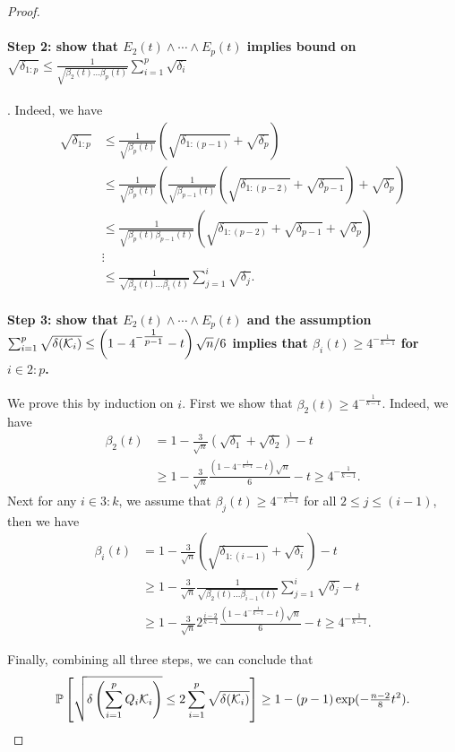 \begin{proof}
    \paragraph{Step 2: show that $E_2(t) \land\cdots\land E_p(t)$ implies bound on $\sqrt{\delta_{1:p}}\leq\tfrac{1}{\sqrt{\beta_2(t)\dots\beta_p(t)}}\sum_{i=1}^p\sqrt{\delta_i}$}. Indeed, we have 
    \begin{align*}
      \sqrt{\delta_{1:p}} &\leq \tfrac{1}{\sqrt{\beta_p(t)}}\left( \sqrt{\delta_{1:(p-1)}} + \sqrt{\delta_p}\right)
      \\&\leq \tfrac{1}{\sqrt{\beta_p(t)}}\left( \tfrac{1}{\sqrt{\beta_{p-1}(t)}}\left( \sqrt{\delta_{1:(p-2)}} + \sqrt{\delta_{p-1}}\right) + \sqrt{\delta_p}\right)
      \\&\leq \tfrac{1}{\sqrt{\beta_p(t)\beta_{p-1}(t)}}\left( \sqrt{\delta_{1:(p-2)}} + \sqrt{\delta_{p-1}} + \sqrt{\delta_p}\right)
      \\&\vdots
      \\&\leq \tfrac{1}{\sqrt{\beta_2(t)\dots\beta_i(t)}}\sum_{j=1}^i\sqrt{\delta_j}.
    \end{align*}
    
    \paragraph{Step 3: show that $E_2(t) \land\cdots\land E_p(t)$ and the assumption $\sum_{i=1}^p \sqrt{\delta(\mathcal{K}_i)} \leq \left(1 - 4^{- \tfrac{1}{p-1} } - t\right)\sqrt{n} / 6$ implies that $\beta_i(t) \geq 4^{-\tfrac{1}{k-1} }$ for $i\in2:p$.} We prove this by induction on $i$. First we show that $\beta_2(t) \geq 4^{-\tfrac{1}{k-1} }$. Indeed, we have 
    \begin{align*}
      \beta_2(t) &= 1 - \tfrac{3}{\sqrt{n}}\left( \sqrt{\delta_1} + \sqrt{\delta_2}\right) - t
      \\&\geq 1 - \tfrac{3}{\sqrt{n}}\tfrac{ \left(1 - 4^{- \tfrac{1}{k-1} } - t\right)\sqrt{n} }{6} - t
      \geq  4^{-\tfrac{1}{k-1} }.
    \end{align*}
     Next for any $i\in3:k$, we assume that $\beta_j(t) \geq 4^{-\tfrac{1}{k-1} }$ for all $2\leq j \leq (i-1)$, then we have 
    \begin{align*}
      \beta_i(t) &=  1 - \tfrac{3}{\sqrt{n}}\left( \sqrt{\delta_{1:(i-1)}} + \sqrt{\delta_i}\right) - t
      \\&\geq 1 - \tfrac{3}{\sqrt{n}} \tfrac{1}{\sqrt{\beta_2(t)\dots\beta_{i-1}(t)}}\sum_{j=1}^{i}\sqrt{\delta_j} - t
      \\&\geq 1 - \tfrac{3}{\sqrt{n}} 2^{ \tfrac{i-2}{k-1} } \tfrac{ \left(1 - 4^{- \tfrac{1}{k-1} } - t\right)\sqrt{n} }{6} - t
      \geq 4^{- \tfrac{1}{k-1} }.
    \end{align*}
    
    Finally, combining all three steps, we can conclude that 
    \begin{equation*}
      \mathbb{P}\left[ \sqrt{\delta\left(\sum_{i=1}^pQ_i\mathcal{K}_i\right)} \leq 2\sum_{i=1}^p \sqrt{\delta(\mathcal{K}_i)}\right] \geq 1 - (p-1)\exp(-\tfrac{n-2}{8}t^2).
    \end{equation*}
\end{proof}

